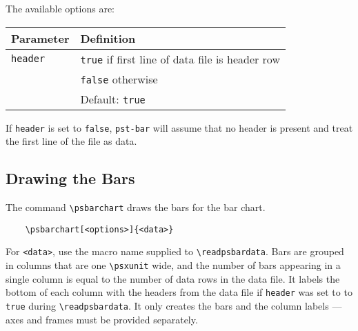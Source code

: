 \documentclass[11pt,english,BCOR10mm,DIV12,bibliography=totoc,parskip=false,smallheadings
    headexclude,footexclude,oneside]{pst-doc}
\begin{document}
      The available options are:
      \begin{center}
        \begin{tabular}{ll}
          \toprule
            Parameter     & Definition\\
          \midrule
            \verb|header| & \verb|true| if first line of data file is header
                            row\\
                          & \verb|false| otherwise\\
                          & Default: \verb|true|\\
          \bottomrule
        \end{tabular}
      \end{center}
      If \verb|header| is set to \verb|false|, \verb|pst-bar| will assume that
      no header is present and treat the first line of the file as data.

    \subsection{Drawing the Bars}
      \label{sec:drawing_bars}%
      The command \verb|\psbarchart| draws the bars for the bar chart.
      \begin{verbatim}
    \psbarchart[<options>]{<data>}\end{verbatim}
      For \verb|<data>|, use the macro name supplied to \verb|\readpsbardata|.
      Bars are grouped in columns that are one \verb|\psxunit| wide, and the
      number of bars appearing in a single column is equal to the number of
      data rows in the data file. It labels the bottom of each column with the
      headers from the data file if \verb|header| was set to to \verb|true|
      during \verb|\readpsbardata|. It only creates the bars and the column
      labels --- axes and frames must be provided separately.
\end{document}
